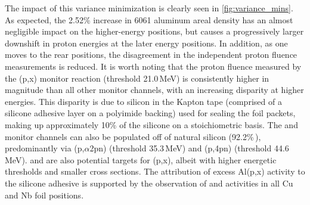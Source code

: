\documentclass[3p]{elsarticle}
\newcommand{\comment}[1]{\todo[color=blue!20!white,inline]{ASV: #1}}
\begin{document}
The impact of this variance minimization is  clearly  seen in   \autoref{fig:variance_mins}.
As expected, the 2.52\% increase in 6061 aluminum areal density has an almost negligible impact on the higher-energy positions, but causes a progressively larger downshift  in proton energies at the later energy positions.
In addition, as one moves to the rear  positions, the disagreement in the independent proton fluence measurements is reduced.
It is worth noting that the proton fluence measured by the (p,x) monitor reaction (threshold 21.0\,MeV) is consistently higher in magnitude than all other monitor channels, with an increasing disparity at higher energies.
This disparity is due to silicon in the Kapton tape (comprised of a silicone adhesive layer on a polyimide backing) used for sealing the foil packets,  making up approximately 10\% of the silicone on a stoichiometric basis.
The  and  monitor channels can also be populated off of natural silicon  (92.2\%\,), predominantly via (p,$\alpha$2pn) (threshold 35.3\,MeV) and (p,4pn) (threshold 44.6\,MeV).
 and  are also potential targets for (p,x), albeit with higher energetic thresholds and smaller cross sections.
The attribution of excess Al(p,x) activity to the silicone adhesive is supported by the observation of  and  activities in all Cu and Nb foil positions.
\end{document}
